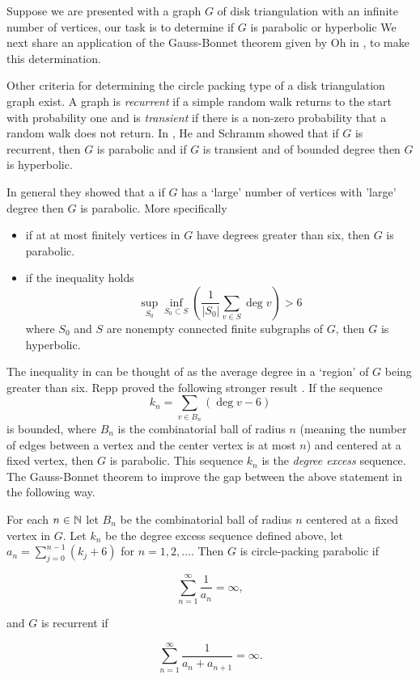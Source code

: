 Suppose we are presented with a graph $G$ of disk triangulation with an infinite 
number of vertices, our task is to determine if $G$ is parabolic or hyperbolic
We next share an application of the Gauss-Bonnet theorem given by Oh in \cite{oh_criteria_2022},
to make this determination.


Other criteria for determining the circle packing type of a disk triangulation graph exist.
A graph is \emph{recurrent} if a simple random walk returns to the start with probability one
and is \emph{transient} if there is a non-zero probability that a random walk does not return.
In \cite{he_hyperbolic_1995}, He and Schramm showed that if $G$ is recurrent, then $G$
is parabolic and if $G$ is transient and of bounded degree then $G$ is hyperbolic.

In general they showed that a if $G$ has a `large' number of vertices with 'large' degree
then $G$ is parabolic. More specifically
\begin{itemize}
\item if at at most finitely vertices in $G$ have degrees greater than six, then $G$ is parabolic.
\item if the inequality holds
\begin{equation}\label{eqn:He-Sch-hyper}
\sup_{S_0}\inf_{S_0\subset S}\left(\frac{1}{|S_0|}\sum_{v\in S}\deg v \right)>6
\end{equation}
where $S_0$ and $S$ are nonempty connected finite subgraphs of $G$, then
$G$ is hyperbolic.
\end{itemize}
The inequality in  can be thought of as the average degree 
in a `region' of $G$ being greater than six.
Repp proved the following stronger result \cite{repp_bounded_2001}.
If the sequence
\begin{equation}\label{eqn:repp}
k_n=\sum_{v\in B_n}(\deg v - 6)
\end{equation}
is bounded, where $B_n$ is the combinatorial ball of radius $n$ (meaning the number of edges
between a vertex and the center vertex is at most $n$) and centered at a fixed vertex,
then $G$ is parabolic.
This sequence $k_n$ is the \emph{degree excess} sequence.
The Gauss-Bonnet theorem to improve the gap between the above
statement in the following way.

\begin{theorem}\label{thm:Oh-packing}
For each $n\in\mathbb{N}$ let $B_n$ be the combinatorial ball of radius $n$
centered at a fixed vertex in $G.$ Let $k_n$ be the degree excess sequence
defined above, let $a_n=\sum_{j=0}^{n-1}(k_j+6)$ for $n=1,2,\ldots$.
Then $G$ is circle-packing parabolic if 

\begin{equation}\label{eqn:cp-parabolic}
\sum_{n=1}^{\infty}\frac{1}{a_n}=\infty,
\end{equation}

and $G$ is recurrent if

\begin{equation}\label{eqn:recurrent}
\sum_{n=1}^{\infty}\frac{1}{a_n+a_{n+1}}=\infty.
\end{equation}

\end{theorem}

